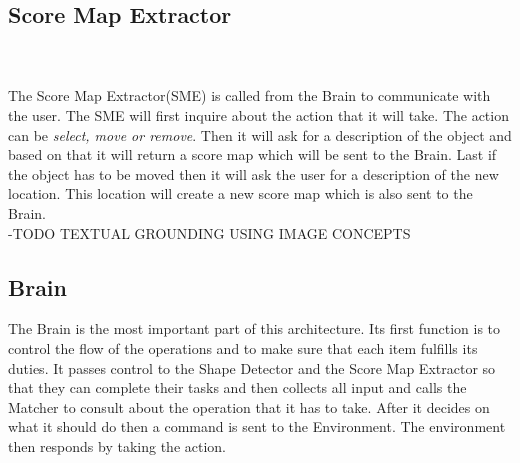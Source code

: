 \documentclass{article}
\begin{document}
     \subsection{Score Map Extractor}
     \\\\
     The Score Map Extractor(SME) is called from the Brain to communicate with the user. The SME will first inquire about the action that it will take. The action can be \textit{select, move or remove}. Then it will ask for a description of the object and based on that it will return a score map which will be sent to the Brain. Last if the object has to be moved then it will ask the user for a description of the new location. This location will create a new score map which is also sent to the Brain.\\
     -TODO TEXTUAL GROUNDING USING IMAGE CONCEPTS\\
    
    \subsection{Brain}
    The Brain is the most important part of this architecture. Its first function is to control the flow of the operations and to make sure that each item fulfills its duties. It passes control to the Shape Detector and the Score Map Extractor so that they can complete their tasks and then collects all input and calls the Matcher to consult about the operation that it has to take. After it decides on what it should do then a command is sent to the Environment. The environment then responds by taking the action.
     
\end{document}
